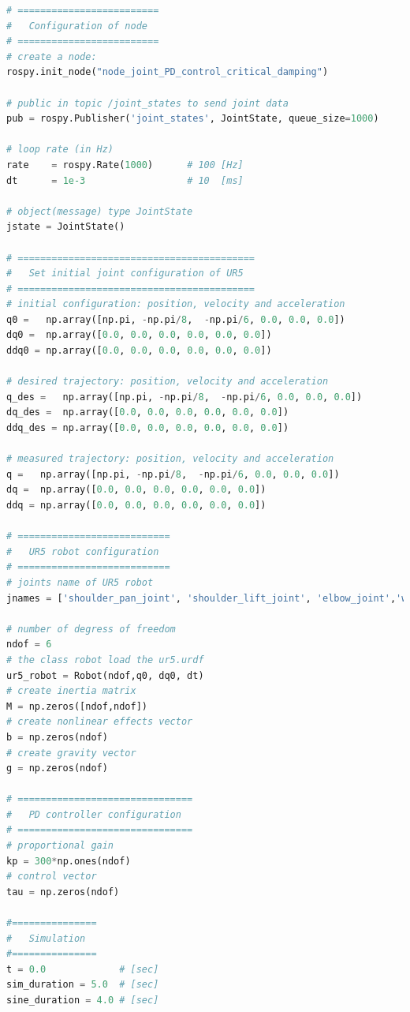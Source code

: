 \begin{lstlisting}[language=Python,caption={Move the second and fifth joint of UR5 robot with the requirement motion of activity 1.5.2}, label={lst:joint_PD_control_critical_damping_sinusoidal}]
# =========================
#   Configuration of node
# =========================
# create a node: 
rospy.init_node("node_joint_PD_control_critical_damping")

# public in topic /joint_states	to send joint data	
pub = rospy.Publisher('joint_states', JointState, queue_size=1000)

# loop rate (in Hz)
rate 	= rospy.Rate(1000)		# 100 [Hz]
dt 		= 1e-3					# 10  [ms]

# object(message) type JointState
jstate = JointState()

# ==========================================
#   Set initial joint configuration of UR5
# ==========================================
# initial configuration: position, velocity and acceleration 
q0 =   np.array([np.pi, -np.pi/8,  -np.pi/6, 0.0, 0.0, 0.0])
dq0 =  np.array([0.0, 0.0, 0.0, 0.0, 0.0, 0.0]) 
ddq0 = np.array([0.0, 0.0, 0.0, 0.0, 0.0, 0.0]) 

# desired trajectory: position, velocity and acceleration
q_des =   np.array([np.pi, -np.pi/8,  -np.pi/6, 0.0, 0.0, 0.0]) 
dq_des =  np.array([0.0, 0.0, 0.0, 0.0, 0.0, 0.0]) 
ddq_des = np.array([0.0, 0.0, 0.0, 0.0, 0.0, 0.0]) 

# measured trajectory: position, velocity and acceleration
q =   np.array([np.pi, -np.pi/8,  -np.pi/6, 0.0, 0.0, 0.0])
dq =  np.array([0.0, 0.0, 0.0, 0.0, 0.0, 0.0]) 
ddq = np.array([0.0, 0.0, 0.0, 0.0, 0.0, 0.0]) 

# ===========================
#   UR5 robot configuration
# ===========================
# joints name of UR5 robot
jnames = ['shoulder_pan_joint', 'shoulder_lift_joint', 'elbow_joint','wrist_1_joint', 'wrist_2_joint', 'wrist_3_joint']

# number of degress of freedom
ndof = 6
# the class robot load the ur5.urdf
ur5_robot = Robot(ndof,q0, dq0, dt)
# create inertia matrix 
M = np.zeros([ndof,ndof])
# create nonlinear effects vector
b = np.zeros(ndof)
# create gravity vector
g = np.zeros(ndof)

# ===============================
#   PD controller configuration
# ===============================
# proportional gain
kp = 300*np.ones(ndof)
# control vector
tau = np.zeros(ndof)    

#===============
#   Simulation
#===============
t = 0.0             # [sec] 
sim_duration = 5.0  # [sec]
sine_duration = 4.0 # [sec]


\end{lstlisting}
